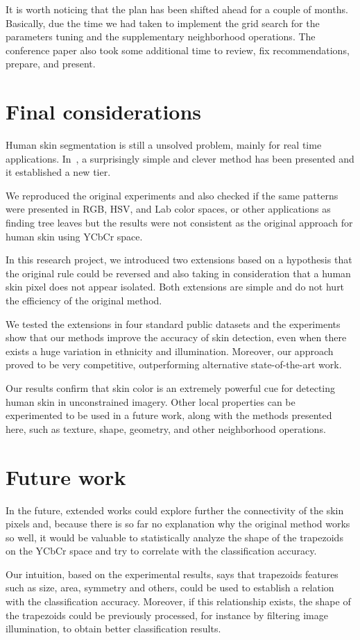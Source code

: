 It is worth noticing that the plan has been shifted ahead for a couple of months. Basically, due the time we had taken to implement the grid search for the parameters tuning and the supplementary neighborhood operations. The conference paper also took some additional time to review, fix recommendations, prepare, and present.


\section{Final considerations}
\label{sec:final_considerations}
Human skin segmentation is still a unsolved problem, mainly for real time applications. In~\cite{brancati:17}, a surprisingly simple and clever method has been presented and it established a new tier. 

We reproduced the original experiments and also checked if the same patterns were presented in RGB, HSV, and Lab color spaces, or other applications as finding tree leaves but the results were not consistent as the original approach for human skin using YCbCr space.  

In this research project, we introduced two extensions based on a hypothesis that the original rule could be reversed and also taking in consideration that a human skin pixel does not appear isolated. Both extensions are simple and do not hurt the efficiency of the original method. 

We tested the extensions in four standard public datasets and the experiments show that our methods improve the accuracy of skin detection, even when there exists a huge variation in ethnicity and illumination. Moreover, our approach proved to be very competitive, outperforming alternative state-of-the-art work.

Our results confirm that skin color is an extremely powerful cue for detecting human skin in unconstrained imagery. Other local properties can be experimented to be used in a future work, along with the methods presented here, such as texture, shape, geometry, and other neighborhood operations.


\section{Future work}
\label{sec:future_work}

In the future, extended works could explore further the connectivity of the skin pixels and, because there is so far no explanation why the original method works so well, it would be valuable to statistically analyze the shape of the trapezoids on the YCbCr space and try to correlate with the classification accuracy. 

Our intuition, based on the experimental results, says that trapezoids features such as size, area, symmetry and others, could be used to establish a relation with the classification accuracy. Moreover, if  this relationship exists, the shape of the trapezoids could be previously processed, for instance by filtering image illumination, to obtain better classification results.